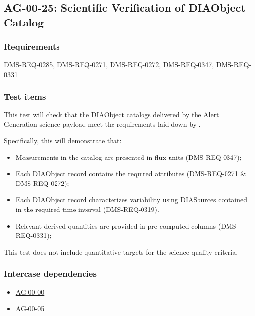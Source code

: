 \subsection{AG-00-25: Scientific Verification of DIAObject Catalog}
\label{ag-00-25}

\subsubsection{Requirements}

DMS-REQ-0285, DMS-REQ-0271, DMS-REQ-0272, DMS-REQ-0347, DMS-REQ-0331

\subsubsection{Test items}
\label{ag-00-25-items}

This test will check that the DIAObject catalogs delivered by the Alert
Generation science
payload meet the requirements laid down by .

Specifically, this will demonstrate that:

\begin{itemize}

  \item{Measurements in the catalog are presented in flux units
  (DMS-REQ-0347);}
\item{Each DIAObject record contains the required attributes (DMS-REQ-0271 \&
	DMS-REQ-0272);}
\item{Each DIAObject record characterizes variability using
	DIASources contained in the required time interval
	(DMS-REQ-0319).}
 \item{Relevant derived quantities are provided in pre-computed columns
  (DMS-REQ-0331);}
\end{itemize}

This test does not include quantitative targets for the science quality criteria.

\subsubsection{Intercase dependencies}

\begin{itemize}

  \item{\hyperref[ag-00-00]{AG-00-00}}
  \item{\hyperref[ag-00-05]{AG-00-05}}

\end{itemize}

